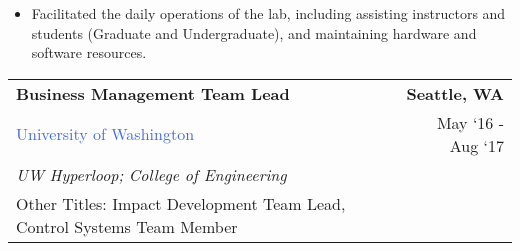 \documentclass[10pt]{article}
\newcommand{\highlightcolor}{RoyalBlue}
\newcommand{\tabularxwidth}{\textwidth}
\begin{document}
\begin{minipage}{\tabularxwidth}
\begin{itemize}[noitemsep, topsep=3pt, parsep=0pt, partopsep=0pt]
                \item 
    Facilitated the daily operations of the lab, including assisting instructors and students (Graduate and Undergraduate), and maintaining hardware and software resources.
            
        \end{itemize}

        
            \vspace{.5em}
        

    \end{minipage}
    
    \begin{minipage}{\tabularxwidth}

        \begin{tabularx}{\tabularxwidth}{X r}
            \textbf{Business Management Team Lead} & \textbf{Seattle, 
        WA} \\
            
    
    
    

    
        \textcolor{\highlightcolor}{University of Washington} & 
        
    May ‘16 - 
    Aug ‘17 \\
        
            \textit{UW Hyperloop;}
                \textit{College of Engineering} & \\
        
    
            
                Other Titles: Impact Development Team Lead, Control Systems Team Member & \\
            
        \end{tabularx}

        \begin{itemize}[noitemsep, topsep=3pt, parsep=0pt, partopsep=0pt]
            

\end{itemize}
\end{minipage}
\end{document}
